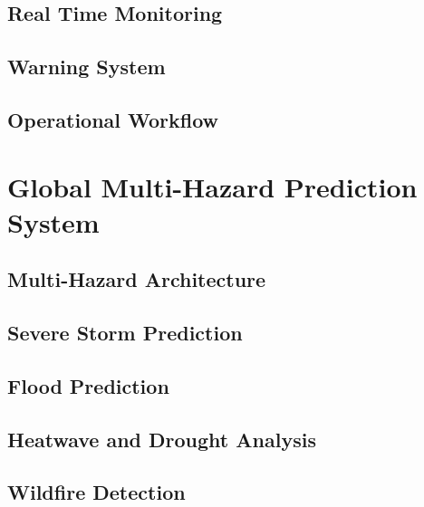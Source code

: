 \documentclass[11pt,a4paper,oneside]{report}
\begin{document}
\chapter{Real Time Monitoring}



\chapter{Warning System}



\chapter{Operational Workflow}



\part{Global Multi-Hazard Prediction System}


\chapter{Multi-Hazard Architecture}



\chapter{Severe Storm Prediction}



\chapter{Flood Prediction}



\chapter{Heatwave and Drought Analysis}



\chapter{Wildfire Detection}

\end{document}
